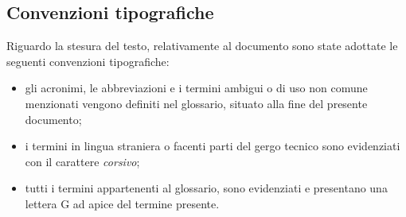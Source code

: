 \subsection{Convenzioni tipografiche}\label{sec:convenzioni-tipografiche}
Riguardo la stesura del testo, relativamente al documento sono state adottate le seguenti convenzioni tipografiche:
\begin{itemize}
	\item gli acronimi, le abbreviazioni e i termini ambigui o di uso non comune menzionati vengono definiti nel glossario, situato alla fine del presente documento;
	\item i termini in lingua straniera o facenti parti del gergo tecnico sono evidenziati con il carattere \emph{corsivo};
	\item tutti i termini appartenenti al glossario, sono evidenziati e presentano una lettera G ad apice del termine presente.
\end{itemize}

